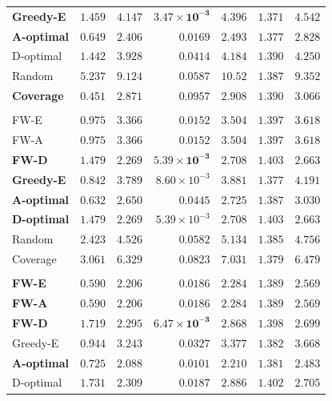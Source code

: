 \documentclass[letterpaper, 9
 pt, conference]{ieeeconf}
\begin{document}
\begin{table}[ht]
\begin{tabular}{lrrrrrr}
\textbf{Greedy-E} & $1.459$ & $4.147$ & $\mathbf{3.47\!\times\!10^{-3}}$ & $4.396$ & $1.371$ & $4.542$ \\
\textbf{A-optimal} & $0.649$ & $\mathbf{2.406}$ & $0.0169$ & $\mathbf{2.493}$ & $1.377$ & $\mathbf{2.828}$ \\
D-optimal & $1.442$ & $3.928$ & $0.0414$ & $4.184$ & $1.390$ & $4.250$ \\
Random & $5.237$ & $9.124$ & $0.0587$ & $10.52$ & $1.387$ & $9.352$ \\
\textbf{Coverage} & $\mathbf{0.451}$ & $2.871$ & $0.0957$ & $2.908$ & $1.390$ & $3.066$ \\
\addlinespace[1pt]
\multicolumn{7}{l}{\textit{$K{=}15$}} \\[1pt]
FW-E & $0.975$ & $3.366$ & $0.0152$ & $3.504$ & $1.397$ & $3.618$ \\
FW-A & $0.975$ & $3.366$ & $0.0152$ & $3.504$ & $1.397$ & $3.618$ \\
\textbf{FW-D} & $1.479$ & $2.269$ & $\mathbf{5.39\!\times\!10^{-3}}$ & $2.708$ & $1.403$ & $2.663$ \\
\textbf{Greedy-E} & $0.842$ & $3.789$ & $8.60\!\times\!10^{-3}$ & $3.881$ & $\mathbf{1.377}$ & $4.191$ \\
\textbf{A-optimal} & $\mathbf{0.632}$ & $2.650$ & $0.0445$ & $2.725$ & $1.387$ & $3.030$ \\
\textbf{D-optimal} & $1.479$ & $\mathbf{2.269}$ & $5.39\!\times\!10^{-3}$ & $\mathbf{2.708}$ & $1.403$ & $\mathbf{2.663}$ \\
Random & $2.423$ & $4.526$ & $0.0582$ & $5.134$ & $1.385$ & $4.756$ \\
Coverage & $3.061$ & $6.329$ & $0.0823$ & $7.031$ & $1.379$ & $6.479$ \\
\addlinespace[1pt]
\multicolumn{7}{l}{\textit{$K{=}20$}} \\[1pt]
\textbf{FW-E} & $\mathbf{0.590}$ & $2.206$ & $0.0186$ & $2.284$ & $1.389$ & $2.569$ \\
\textbf{FW-A} & $\mathbf{0.590}$ & $2.206$ & $0.0186$ & $2.284$ & $1.389$ & $2.569$ \\
\textbf{FW-D} & $1.719$ & $2.295$ & $\mathbf{6.47\!\times\!10^{-3}}$ & $2.868$ & $1.398$ & $2.699$ \\
Greedy-E & $0.944$ & $3.243$ & $0.0327$ & $3.377$ & $1.382$ & $3.668$ \\
\textbf{A-optimal} & $0.725$ & $\mathbf{2.088}$ & $0.0101$ & $\mathbf{2.210}$ & $\mathbf{1.381}$ & $\mathbf{2.483}$ \\
D-optimal & $1.731$ & $2.309$ & $0.0187$ & $2.886$ & $1.402$ & $2.705$ \\

\end{tabular}
\end{table}
\end{document}
